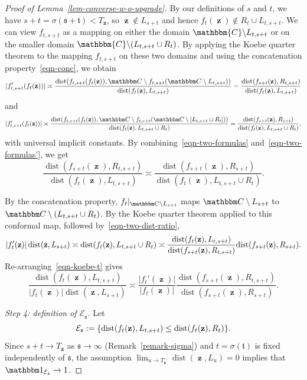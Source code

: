 \documentclass[11pt]{article}
\theoremstyle{plain}
\theoremstyle{definition}
\numberwithin{equation}{section}
\newcommand{\eqb}{\begin{equation}}
\newcommand{\eqe}{\end{equation}}
\newcommand{\BB}{\mathbbm}
\newcommand{\op}{\operatorname}
\newcommand{\frk}{\mathfrak}
\newcommand{\rta}{\rightarrow}
\newcommand{\mcl}{\mathcal}
\newcommand{\dist}{{\operatorname{dist}}}
\newcommand{\zz}{{\op{\mathbf{z}}}}
\newcommand{\tz}{{\mathfrak t}}
\newcommand{\sz}{{\mathfrak s}}
\let\originalleft\left
\let\originalright\right
\renewcommand{\left}{\mathopen{}\mathclose\bgroup\originalleft}
\renewcommand{\right}{\aftergroup\egroup\originalright}
\begin{document}
\begin{proof}[Proof of Lemma~\ref{lem-converse-w-o-upgrade}]
By our definitions of $s$ and $t$, we have $s+t = \sigma(\frk s + \frk t)  <T_\zz$, so $\zz\notin L_{s+t}$ and hence $f_t(\zz) \notin R_t \cup L_{t,s+t}$. 
We can view $f_{t,s+t}$ as a mapping on either the domain $\BB{C} \backslash L_{t,s+t}$ or on the smaller domain $\BB{C} \backslash (L_{t,s+t} \cup R_{t})$.  By applying the Koebe quarter theorem to the mapping $f_{t,s+t}$ on these two domains and using the concatenation property~\eqref{eqn-conc}, we obtain
\eqb
|f_{t,s+t}'(f_t(\zz))| 
\asymp \frac{\dist(f_{t,s+t}(f_t(\zz)),  \BB C\setminus f_{t,s+t}(\BB C\setminus L_{t,s+t})  )}{\dist(f_t(\zz),L_{t,s+t})} 
= \frac{\dist(f_{s+t}(\zz),R_{t,s+t})}{\dist(f_t(\zz),L_{t,s+t})}  
\label{eqn-two-formulas}
\eqe
and
\eqb 
|f_{t,s+t}'(f_{t}(\zz))| 
\asymp \frac{\dist(f_{t,s+t}(f_t(\zz)),  \BB C\setminus f_{t,s+t}(\BB C\setminus [L_{t,s+t} \cup R_t] )  )}{\dist(f_t(\zz),L_{t,s+t} \cup R_t)} 
= \frac{\dist(f_{s+t}(\zz), R_{s+t})}{\dist(f_{t}(\zz),L_{t,s+t} \cup R_{t})},
\label{eqn-two-formulas'}
\eqe
with universal implicit constants. By combining~\eqref{eqn-two-formulas} and~\eqref{eqn-two-formulas'}, we get
\eqb \label{eqn-two-dist-ratio}
 \frac{\dist(f_{s+t}(\zz),R_{t,s+t})}{\dist(f_t(\zz),L_{t,s+t})} \asymp \frac{\dist(f_{s+t}(\zz), R_{s+t})}{\dist(f_{t}(\zz),L_{t,s+t} \cup R_{t})}  .
\eqe
 
By the concatenation property, $f_t|_{\BB C\setminus L_{s+t}}$ maps $\BB C\setminus L_{s+t}$ to $ \BB C\setminus (L_{t,s+t} \cup R_t)$. 
By the Koebe quarter theorem applied to this conformal map, followed by~\eqref{eqn-two-dist-ratio},
\eqb \label{eqn-koebe-t}
|f_t'(\zz)| \op{dist}(\zz,L_{s+t}) 
\asymp \op{dist}\left(f_t(\zz) , L_{t,s+t} \cup R_t \right) 
\asymp  \frac{\dist(f_t(\zz),L_{t,s+t})}{\dist(f_{s+t}(\zz),R_{t,s+t})} \dist(f_{s+t}(\zz), R_{s+t}) .
\eqe
Re-arranging~\eqref{eqn-koebe-t} gives
\eqb
\frac{\dist(f_t(\zz),L_{t,s+t})}{|f_t(\zz)| \dist(\zz,L_{s+t})} \asymp \frac{|f_t'(\zz)|}{|f_t(\zz)|} \frac{\dist(f_{s+t}(\zz),R_{t,s+t})}{\dist(f_{s+t}(\zz),R_{s+t})}.
\label{eqn-dist-1}
\eqe 
\medskip



\noindent\textit{Step 4: definition of $\mcl E_{\sz}$.}
Let
\eqb \label{eqn-dist-event}
\mcl{E}_{\sz}   := \left\{ \dist(f_t(\zz),L_{t,s+t}) \leq  \dist(f_t(\zz),R_t) \right\} .
\eqe 
Since $s + t \rta T_{\zz}$ as $\sz\rta\infty$ (Remark~\ref{remark-sigma}) and $t = \sigma(\tz)$ is fixed independently of $\sz$, the assumption $\lim_{u \rta  T_{\zz}^-} \dist(\zz,L_u) = 0 $ implies that $\BB 1_{\mcl E_{\sz}} \rta 1$. 


\end{proof}
\end{document}
